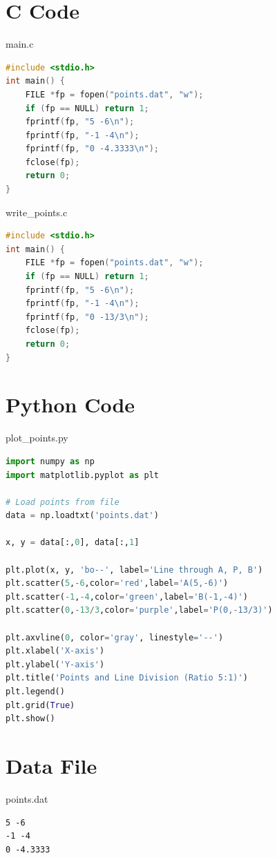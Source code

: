 \documentclass{beamer}
\begin{document}
\section{C Code}
\begin{frame}[fragile]{main.c}
\begin{lstlisting}[language=C]
#include <stdio.h>
int main() {
    FILE *fp = fopen("points.dat", "w");
    if (fp == NULL) return 1;
    fprintf(fp, "5 -6\n");
    fprintf(fp, "-1 -4\n");
    fprintf(fp, "0 -4.3333\n");
    fclose(fp);
    return 0;
}
\end{lstlisting}
\end{frame}

\begin{frame}[fragile]{write\_points.c}
\begin{lstlisting}[language=C]
#include <stdio.h>
int main() {
    FILE *fp = fopen("points.dat", "w");
    if (fp == NULL) return 1;
    fprintf(fp, "5 -6\n");
    fprintf(fp, "-1 -4\n");
    fprintf(fp, "0 -13/3\n");
    fclose(fp);
    return 0;
}
\end{lstlisting}
\end{frame}

\section{Python Code}
\begin{frame}[fragile]{plot\_points.py}
\begin{lstlisting}[language=Python]
import numpy as np
import matplotlib.pyplot as plt

# Load points from file
data = np.loadtxt('points.dat')

x, y = data[:,0], data[:,1]

plt.plot(x, y, 'bo--', label='Line through A, P, B')
plt.scatter(5,-6,color='red',label='A(5,-6)')
plt.scatter(-1,-4,color='green',label='B(-1,-4)')
plt.scatter(0,-13/3,color='purple',label='P(0,-13/3)')

plt.axvline(0, color='gray', linestyle='--')
plt.xlabel('X-axis')
plt.ylabel('Y-axis')
plt.title('Points and Line Division (Ratio 5:1)')
plt.legend()
plt.grid(True)
plt.show()
\end{lstlisting}
\end{frame}

\section{Data File}
\begin{frame}[fragile]{points.dat}
\begin{lstlisting}
5 -6
-1 -4
0 -4.3333
\end{lstlisting}
\end{frame}
\end{document}
